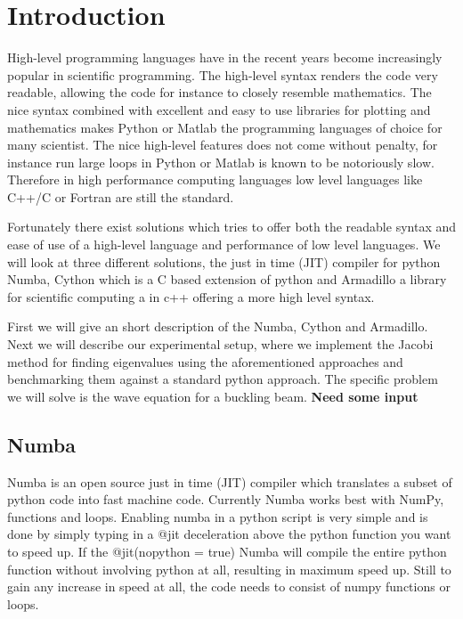 \section*{Introduction}

High-level programming languages have in the recent years become increasingly
popular in scientific programming. The high-level syntax renders the code very
readable,
allowing the code for instance to closely resemble mathematics. The nice syntax
combined with excellent and easy to use libraries
for plotting and mathematics makes Python or Matlab the
programming languages of choice for many scientist.
The nice high-level features does not come without penalty, for
instance run large loops in Python or Matlab is known to be notoriously slow.
Therefore in high performance computing languages low level languages like C++/C
or Fortran are still the standard. 

Fortunately there exist solutions which tries to offer both the readable syntax
and ease of use of a high-level language and performance of low level languages.
We will
look at three different solutions, the just in time (JIT) compiler for python
Numba, Cython which is a C based extension of python and Armadillo a
library for scientific computing a in c++ offering a more high level syntax. 

First we will give an short description of the Numba, Cython and Armadillo. 
Next we will describe our experimental setup, where we implement the Jacobi
method for finding eigenvalues using the aforementioned approaches and
benchmarking them against a standard python approach. The specific problem we
will solve is the wave equation for a buckling beam. \textbf{Need some input}     


\subsection*{Numba}
Numba is an open source just in time (JIT) compiler which translates a subset of
python code 
into fast machine code. Currently Numba works best with NumPy, functions
and loops. Enabling numba in a python script is very simple and is done by
simply typing in a @jit deceleration above the python function you want to speed
up. If the @jit(nopython = true) Numba will compile the entire python function
without involving python at all, resulting in maximum speed up. Still to gain
any increase in speed at all, the code needs to consist of 
numpy functions or loops.   

